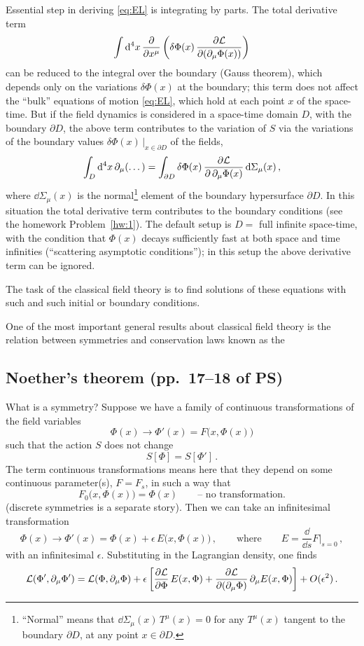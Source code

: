 \begin{remark}
Essential step in deriving \eqref{eq:EL} is integrating by parts. The total
derivative term
\[
\int \mathop{}\!\mathrm{d}^4x\,\frac{\partial}{\partial x^\mu}\left(\delta\Phi(x)\,\frac{\partial\mathcal{L}}{\partial(\partial_\mu\Phi(x))}\right)
\]
can be reduced to the integral over the boundary (Gauss theorem), which
depends only on the variations $\delta\Phi(x)$ at the boundary; this term does
not affect the ``bulk'' equations of motion \eqref{eq:EL}, which hold at each
point $x$ of the space-time. But if the field dynamics is considered in a
space-time domain $D$, with the boundary $\partial D$, the above term
contributes to the variation of $S$ via the variations of the boundary values
$\delta\Phi(x)\,|_{x\in\partial D}$ of the fields,
\[
\int_D \mathop{}\!\mathrm{d}^4x\,\partial_\mu(\dots)=\int_{\partial D}\delta\Phi(x)\,\frac{\partial\mathcal{L}}{\partial\,\partial_\mu\Phi(x)}\mathop{}\!\mathrm{d}\Sigma_\mu(x)\,,
\]
where $\dd\Sigma_\mu(x)$ is the normal\footnote{``Normal'' means that
$\dd\Sigma_\mu(x)\,T^\mu(x)=0$ for any $T^\mu(x)$ tangent to the boundary
$\partial D$, at any point $x\in\partial D$.} element of the boundary
hypersurface $\partial D$. In this situation the total derivative term
contributes to the boundary conditions (see the homework
Problem~\ref{hw:1}). The default setup is $D=$ full infinite space-time, with
the condition that $\Phi(x)$ decays sufficiently fast at both space and time
infinities (``scattering asymptotic conditions''); in this setup the above
derivative term can be ignored.
\end{remark}

The task of the classical field theory is to find solutions of these
equations with such and such initial or boundary conditions.

One of the most important general results about classical field theory is
the relation between symmetries and conservation laws known as the

\subsection*{Noether's theorem (pp.~17--18 of PS)}

What is a symmetry? Suppose we have a family of continuous transformations of
the field variables
\[
\Phi(x)\to\Phi'(x)=F\bigl(x,\Phi(x)\bigr)
\]
such that the action $S$ does not change
\[
S[\Phi]=S[\Phi']\,.
\]
The term continuous transformations means here that they depend on some
continuous parameter(s), $F=F_s$, in such a way that
\[
F_0\bigl(x,\Phi(x)\bigr)=\Phi(x)\qquad\text{-- no transformation.}
\]
(discrete symmetries is a separate story). Then we can take an infinitesimal
transformation
\[
\Phi(x)\to\Phi'(x)=\Phi(x)+\epsilon\,E\bigl(x,\Phi(x)\bigr)\,,
\qquad\text{where}\qquad
E=\frac{\dd}{\dd s}F\Big|_{s=0}\,,
\]
with an infinitesimal $\epsilon$. Substituting in the Lagrangian density, one
finds
\[
\mathcal{L}(\Phi',\partial_\mu\Phi')=\mathcal{L}(\Phi,\partial_\mu\Phi)
+\epsilon\left[\frac{\partial\mathcal{L}}{\partial\Phi}\,E(x,\Phi)+\frac{\partial\mathcal{L}}{\partial(\partial_\mu\Phi)}\,\partial_\mu E(x,\Phi)\right]+O(\epsilon^2)\,.
\]

